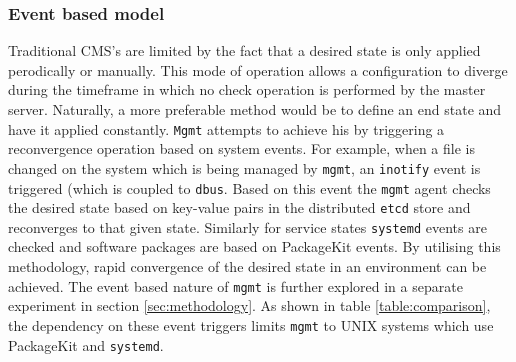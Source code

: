 \subsubsection{Event based model}
Traditional CMS's are limited by the fact that a desired state is only applied perodically or manually. This mode of operation allows a configuration to diverge during the timeframe in which no check operation is performed by the master server. Naturally, a more preferable method would be to define an end state and have it applied constantly. \texttt{Mgmt} attempts to achieve his by triggering a reconvergence operation based on system events. For example, when a file is changed on the system which is being managed by \texttt{mgmt}, an \texttt{inotify} event is triggered (which is coupled to \texttt{dbus}. Based on this event the \texttt{mgmt} agent checks the desired state based on key-value pairs in the distributed \texttt{etcd} store and reconverges to that given state. Similarly for service states \texttt{systemd} events are checked and software packages are based on PackageKit events. By utilising this methodology, rapid convergence of the desired state in an environment can be achieved. The event based nature of \texttt{mgmt} is further explored in a separate experiment in section \ref{sec:methodology}. As shown in table \ref{table:comparison}, the dependency on these event triggers limits \texttt{mgmt} to UNIX systems which use PackageKit and \texttt{systemd}.  


